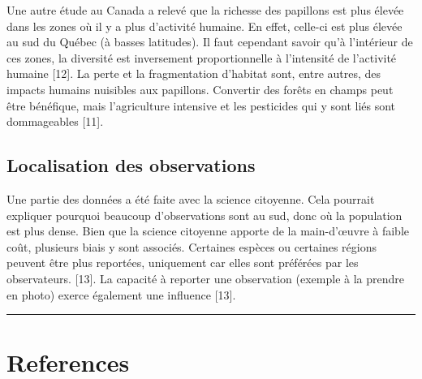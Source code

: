 \documentclass[preprint, 3p,
authoryear]{elsarticle} %
\begin{document}
Une autre étude au Canada a relevé que la richesse des papillons est
plus élevée dans les zones où il y a plus d'activité humaine. En effet,
celle-ci est plus élevée au sud du Québec (à basses latitudes). Il faut
cependant savoir qu'à l'intérieur de ces zones, la diversité est
inversement proportionnelle à l'intensité de l'activité humaine
{[}12{]}. La perte et la fragmentation d'habitat sont, entre autres, des
impacts humains nuisibles aux papillons. Convertir des forêts en champs
peut être bénéfique, mais l'agriculture intensive et les pesticides qui
y sont liés sont dommageables {[}11{]}.

\subsection{Localisation des
observations}\label{localisation-des-observations}

Une partie des données a été faite avec la science citoyenne. Cela
pourrait expliquer pourquoi beaucoup d'observations sont au sud, donc où
la population est plus dense. Bien que la science citoyenne apporte de
la main-d'œuvre à faible coût, plusieurs biais y sont associés.
Certaines espèces ou certaines régions peuvent être plus reportées,
uniquement car elles sont préférées par les observateurs. {[}13{]}. La
capacité à reporter une observation (exemple à la prendre en photo)
exerce également une influence {[}13{]}.

\begin{center}\rule{0.5\linewidth}{0.5pt}\end{center}

\section{References}\label{references}
\end{document}
